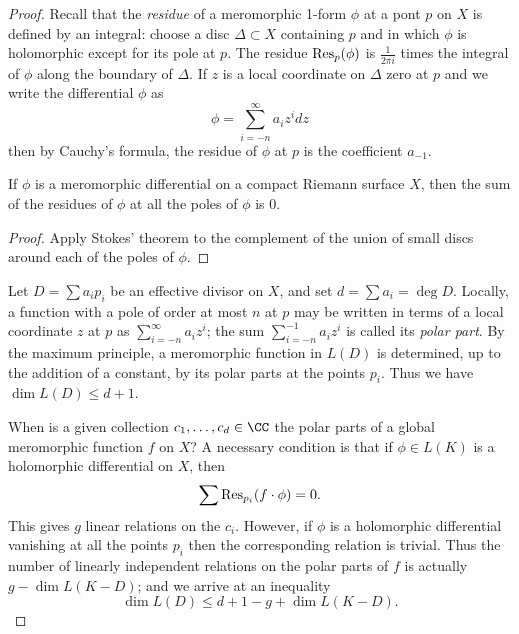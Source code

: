 \begin{proof}
%
Recall that the \emph{residue} of a meromorphic 1-form $\phi$ at a pont $p$ on $X$ is defined by an integral: choose a disc $\Delta \subset X$ containing $p$ and in which $\phi$ is holomorphic except for its pole at $p$. The residue ${\rm Res}_p(\phi)$ is $\frac{1}{2\pi i}$ times the integral of $\phi$ along the boundary of $\Delta$. If $z$ is a local coordinate on $\Delta$ zero at $p$ and we write the differential $\phi$ as
$$
\phi = \sum_{i=-n}^\infty a_iz^i dz
$$
then by Cauchy's formula, the residue of $\phi$ at $p$ is the coefficient $a_{-1}$. 

\begin{proposition}\label{residue sum}
 If $\phi$ is a meromorphic differential on a compact Riemann surface $X$, then the sum of the residues of $\phi$
 at all the poles of $\phi$ is 0.
 \end{proposition}
 
\begin{proof}
Apply Stokes' theorem to the complement of the union of small discs around each of the poles of $\phi$.
\end{proof}

Let  $D = \sum a_ip_i$ be an effective divisor on $X$, and set $d = \sum a_i = \deg D$. Locally, a function with a pole of order at most $n$ at $p$ may be written in terms of a local coordinate $z$ at $p$ as $\sum_{i=-n}^\infty a_{i}z^{i} $;
the sum $\sum_{i=-n}^{-1} a_{i}z^{i}$ is called its \emph{polar part}.
By the maximum principle, a meromorphic function in $L(D)$ is determined, up to the addition of a constant, by its polar parts at the points $p_i$. Thus we have $\dim L(D) \leq d+1$.

When is a given collection $c_1,\dots,c_d \in \CC$ the polar parts of a global meromorphic function $f$ on $X$? A necessary condition
is that if $\phi \in L(K)$ is a holomorphic differential on $X$, then
$$
\sum {\rm Res}_{p_i}(f \cdot \phi) = 0.
$$
This gives $g$ linear relations on the $c_i$. However, if $\phi$ is a holomorphic differential vanishing at all the points $p_i$
then the corresponding relation is trivial. Thus the number of linearly independent relations on the polar parts of $f$ is actually $g - \dim L(K-D)$; and we arrive at an inequality
$$
\dim L(D) \leq d + 1 - g + \dim L(K-D).
$$


\end{proof}
